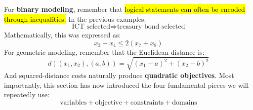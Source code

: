 \begin{takeawaysbox}
    \highspace
    For \textbf{binary modeling}, remember that \hl{logical statements can often be encoded through inequalities.} In the previous examples:
    \begin{equation*}
        \text{ICT selected}
        \Rightarrow
        \text{treasury bond selected}
    \end{equation*}
    Mathematically, this was expressed as:
    \begin{equation*}
        x_3+x_4 \leq 2(x_7+x_8)
    \end{equation*}
    For geometric modeling, remember that the Euclidean distance is:
    \begin{equation*}
        d((x_1,x_2),(a,b))
        =
        \sqrt{(x_1-a)^2+(x_2-b)^2}
    \end{equation*}
    And squared-distance costs naturally produce \textbf{quadratic objectives}. Most importantly, this section has now introduced the four fundamental pieces we will repeatedly use:
    \begin{equation*}
        \text{variables}
        +
        \text{objective}
        +
        \text{constraints}
        +
        \text{domains}
    \end{equation*}
\end{takeawaysbox}
